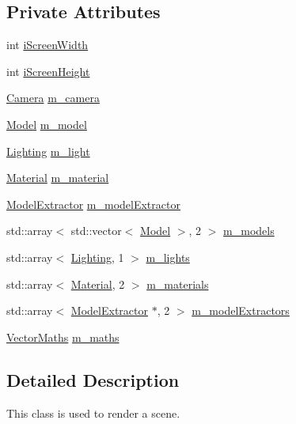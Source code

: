 \subsection*{Private Attributes}
\begin{DoxyCompactItemize}
\item 
int \hyperlink{class_scene_a778137dcab836e6be4217615873db576}{i\+Screen\+Width}
\item 
int \hyperlink{class_scene_aac44019cbb3024de33132b0f278708f9}{i\+Screen\+Height}
\item 
\hyperlink{class_camera}{Camera} \hyperlink{class_scene_a1b706ed302145fe191131cefe8873fec}{m\+\_\+camera}
\item 
\hyperlink{class_model}{Model} \hyperlink{class_scene_a8398e5ee10d0a39903a26d665f3f3a9f}{m\+\_\+model}
\item 
\hyperlink{class_lighting}{Lighting} \hyperlink{class_scene_af2eaac7f7e7997e0b2a47373f55cb2e1}{m\+\_\+light}
\item 
\hyperlink{class_material}{Material} \hyperlink{class_scene_a80eed5a8d1800f3b426bca2eda26d4b6}{m\+\_\+material}
\item 
\hyperlink{class_model_extractor}{Model\+Extractor} \hyperlink{class_scene_aadd2050cd69c19889b146c6334feb8dd}{m\+\_\+model\+Extractor}
\item 
std\+::array$<$ std\+::vector$<$ \hyperlink{class_model}{Model} $>$, 2 $>$ \hyperlink{class_scene_a10335e874947752239a933d35d926c3b}{m\+\_\+models}
\item 
std\+::array$<$ \hyperlink{class_lighting}{Lighting}, 1 $>$ \hyperlink{class_scene_adb68e0b4186fa78d472880f259e49671}{m\+\_\+lights}
\item 
std\+::array$<$ \hyperlink{class_material}{Material}, 2 $>$ \hyperlink{class_scene_af5fcdd7b94d1669008bd13d7ecde01c1}{m\+\_\+materials}
\item 
std\+::array$<$ \hyperlink{class_model_extractor}{Model\+Extractor} $\ast$, 2 $>$ \hyperlink{class_scene_a023c55afb84b247b9c51f6d33131102c}{m\+\_\+model\+Extractors}
\item 
\hyperlink{class_vector_maths}{Vector\+Maths} \hyperlink{class_scene_a64101e7e0ed72202c9898a5eddf28a7d}{m\+\_\+maths}
\end{DoxyCompactItemize}


\subsection{Detailed Description}
This class is used to render a scene. 

